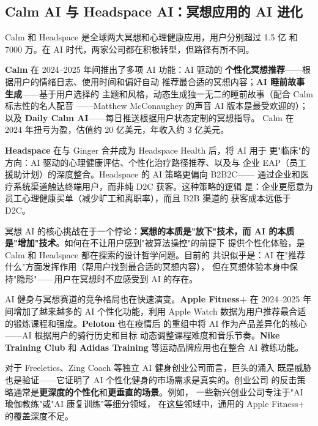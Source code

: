 \subsection{Calm AI 与 Headspace AI：冥想应用的 AI 进化}
\label{subsec:calm-headspace}

Calm 和 Headspace 是全球两大冥想和心理健康应用，用户分别超过 1.5 亿
和 7000 万。在 AI 时代，两家公司都在积极转型，但路径有所不同。

\textbf{Calm} 在 2024--2025 年间推出了多项 AI 功能：AI 驱动的
\textbf{个性化冥想推荐}——根据用户的情绪日志、使用时间和偏好自动
推荐最合适的冥想内容；\textbf{AI 睡前故事生成}——基于用户选择的
主题和风格，动态生成独一无二的睡前故事（配合 Calm 标志性的名人配音
——Matthew McConaughey 的声音 AI 版本是最受欢迎的）；以及
\textbf{Daily Calm AI}——每日推送根据用户状态定制的冥想指导。
Calm 在 2024 年扭亏为盈，估值约 20 亿美元，年收入约 3 亿美元。

\textbf{Headspace} 在与 Ginger 合并成为 Headspace Health 后，将 AI 用于
更"临床"的方向：AI 驱动的心理健康评估、个性化治疗路径推荐、以及与
企业 EAP（员工援助计划）的深度整合。Headspace 的 AI 策略更偏向 B2B2C——
通过企业和医疗系统渠道触达终端用户，而非纯 D2C 获客。这种策略的逻辑
是：企业更愿意为员工心理健康买单（减少旷工和离职率），而且 B2B 渠道的
获客成本远低于 D2C。

冥想 AI 的核心挑战在于一个悖论：\textbf{冥想的本质是"放下"技术，而
AI 的本质是"增加"技术}。如何在不让用户感到"被算法操控"的前提下
提供个性化体验，是 Calm 和 Headspace 都在探索的设计哲学问题。目前的
共识似乎是：AI 在"推荐什么"方面发挥作用（帮用户找到最合适的冥想内容），
但在冥想体验本身中保持"隐形"——用户在冥想时不应感受到 AI 的存在。

AI 健身与冥想赛道的竞争格局也在快速演变。\textbf{Apple Fitness+}
在 2024--2025 年间增加了越来越多的 AI 个性化功能，利用 Apple Watch
数据为用户推荐最合适的锻炼课程和强度。\textbf{Peloton} 也在疫情后
的重组中将 AI 作为产品差异化的核心——AI 根据用户的骑行历史和目标
动态调整课程难度和音乐节奏。\textbf{Nike Training Club} 和 \textbf{Adidas
Training} 等运动品牌应用也在整合 AI 教练功能。

对于 Freeletics、Zing Coach 等独立 AI 健身创业公司而言，巨头的涌入
既是威胁也是验证——它证明了 AI 个性化健身的市场需求是真实的。创业公司
的反击策略通常是\textbf{更深度的个性化}和\textbf{更垂直的场景}。例如，
一些新兴创业公司专注于"AI 瑜伽教练"或"AI 康复训练"等细分领域，
在这些领域中，通用的 Apple Fitness+ 的覆盖深度不足。

